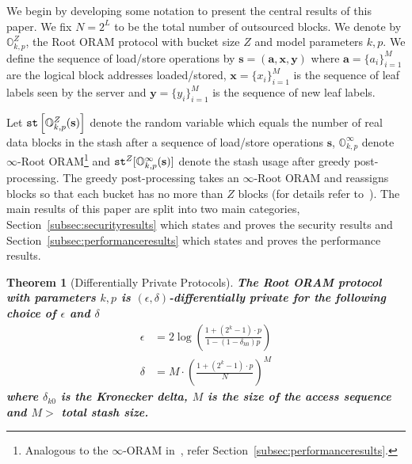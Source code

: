 \documentclass[USenglish,oneside,twocolumn]{article}
\makeatletter
\newtheorem{theorem}{Theorem}
\newcommand{\ourprotocol}{Root ORAM}
\let\origsubsection\subsection
\renewcommand\subsection{\@ifstar{\starsubsection}{\nostarsubsection}}
\newcommand\nostarsubsection[1]
{\subsectionprelude\origsubsection{#1}\subsectionpostlude}
\newcommand\starsubsection[1]
{\subsectionprelude\origsubsection*{#1}\subsectionpostlude}
\newcommand\subsectionprelude{\vspace{-1.5em}}
\newcommand\subsectionpostlude{\vspace{-1em}}
\makeatother
\begin{document}
\subsection{Notation}\label{subsec:notation}
We begin by developing some notation to present the central results of this paper. We fix $N = 2^L$ to be the total number of outsourced blocks. We denote by $\mathbb{O}_{k,p}^Z$, the \ourprotocol{} protocol with bucket size $Z$ and model parameters $k, p$. We define the sequence of load/store operations by $\textbf{s} = (\textbf{a}, \textbf{x}, \textbf{y})$ where $\textbf{a} = \{ a_i \}_{i=1}^M$ are the logical block addresses loaded/stored, $\textbf{x} = \{ x_i \}_{i=1}^M$ is the sequence of leaf labels seen by the server and $\textbf{y} = \{ y_i \}_{i=1}^M$ is the sequence of new leaf labels.

Let ${\tt st}\left[ \mathbb{O}_{k,p}^Z(\textbf{s}) \right]$ denote the random variable which equals the number of real data blocks in the stash after a sequence of load/store operations $\textbf{s}$, $\mathbb{O}_{k,p}^{\infty}$ denote $\infty$-\ourprotocol{}\footnote{Analogous to the $\infty$-ORAM in~\cite{pathoram}, refer Section~\ref{subsec:performanceresults}.} and ${\tt st}^Z [\mathbb{O}_{k,p}^{\infty} (\textbf{s}) ]$ denote the stash usage after greedy post-processing. The greedy post-processing takes an $\infty$-\ourprotocol{} and reassigns blocks so that each bucket has no more than $Z$ blocks (for details refer to~\cite{pathoram}). The main results of this paper are split into two main categories, Section~\ref{subsec:securityresults} which states and proves the security results and Section~\ref{subsec:performanceresults} which states and proves the performance results. 


\subsection{Security Results}\label{subsec:securityresults}
\begin{theorem}[Differentially Private Protocols]\label{thm:epsilon}
\textbf{The \ourprotocol{} protocol with parameters $k,p$ is $(\epsilon, \delta)$-differentially private for the following choice of $\epsilon$ and $\delta$
\begin{equation}
\begin{aligned}
\epsilon &= 2 \log \left( \frac{1 + (2^k - 1) \cdot p}{1- (1-\delta_{k0}) p} \right) \\
\delta &= M \cdot \left( \frac{1+ (2^k - 1) \cdot p}{N} \right)^{M}
\end{aligned}
\end{equation}
where $\delta_{k0}$ is the Kronecker delta, $M$ is the size of the access sequence and $M >$ total stash size.}
\end{theorem}
\end{document}
